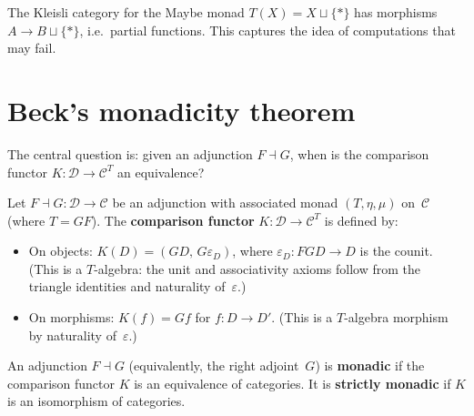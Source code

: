 \begin{example}\label{ex:kleisli-maybe}
The Kleisli category for the Maybe monad $T(X)=X\sqcup\{*\}$ has
morphisms $A\to B\sqcup\{*\}$, i.e.\ partial functions.  This
captures the idea of computations that may fail.
\end{example}


\section{Beck's monadicity theorem}\label{sec:beck}

The central question is: given an adjunction $F\dashv G$, when is the
comparison functor $K\colon\mathcal{D}\to\mathcal{C}^T$ an equivalence?

\begin{definition}\label{def:comparison-functor}
Let $F\dashv G\colon\mathcal{D}\to\mathcal{C}$ be an adjunction with
associated monad $(T,\eta,\mu)$ on~$\mathcal{C}$ (where $T = GF$).
The \textbf{comparison functor}
$K\colon\mathcal{D}\to\mathcal{C}^T$
is defined by:
\begin{itemize}
\item On objects: $K(D) = (GD,\, G\varepsilon_D)$, where
    $\varepsilon_D\colon FGD\to D$ is the counit.
    (This is a $T$-algebra: the unit and associativity axioms follow
    from the triangle identities and naturality of~$\varepsilon$.)
\item On morphisms: $K(f) = Gf$ for $f\colon D\to D'$.
    (This is a $T$-algebra morphism by naturality of~$\varepsilon$.)
\end{itemize}
\end{definition}

\begin{definition}\label{def:monadic}
An adjunction $F\dashv G$ (equivalently, the right adjoint~$G$) is
\textbf{monadic} if the comparison functor $K$ is an equivalence of
categories.  It is \textbf{strictly monadic} if $K$ is an isomorphism
of categories.
\end{definition}

